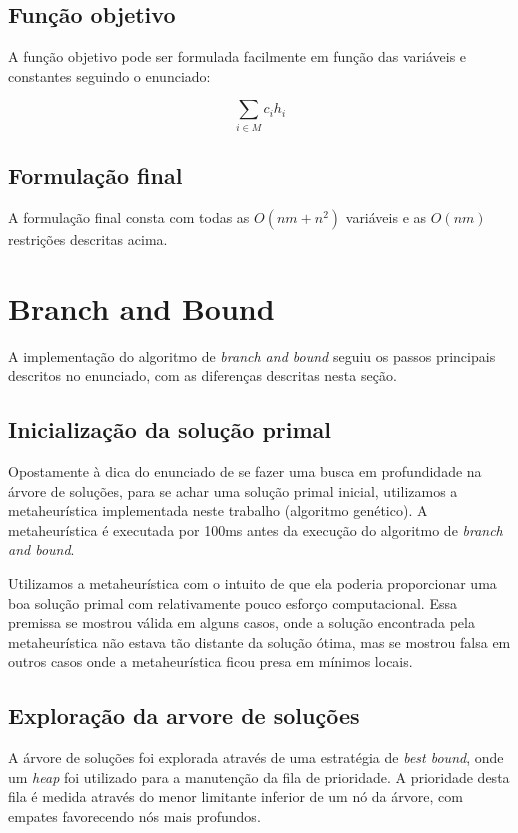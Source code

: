 \documentclass[a4paper,11pt]{article}
\begin{document}
\subsection{Função objetivo}
A função objetivo pode ser formulada facilmente em função das variáveis e constantes
seguindo o enunciado:

\begin{equation}
  \sum_{i \in M} c_i h_i
\end{equation}

\subsection{Formulação final}
A formulação final consta com todas as $O(nm + n^2)$ variáveis e as $O(nm)$
restrições descritas acima.

\section{Branch and Bound}
A implementação do algoritmo de \textit{branch and bound} seguiu os passos principais
descritos no enunciado, com as diferenças descritas nesta seção.

\subsection{Inicialização da solução primal}
Opostamente à dica do enunciado de se fazer uma busca em profundidade na árvore
de soluções, para se achar uma solução primal inicial, utilizamos a metaheurística
implementada neste trabalho (algoritmo genético). A metaheurística é executada
por 100ms antes da execução do algoritmo de \textit{branch and bound}.

Utilizamos a metaheurística com o intuito de que ela poderia proporcionar uma
boa solução primal com relativamente pouco esforço computacional. Essa premissa
se mostrou válida em alguns casos, onde a solução encontrada pela metaheurística
não estava tão distante da solução ótima, mas se mostrou falsa em outros casos
onde a metaheurística ficou presa em mínimos locais.

\subsection{Exploração da arvore de soluções}
A árvore de soluções foi explorada através de uma estratégia de \textit{best bound},
onde um \textit{heap} foi utilizado para a manutenção da fila de prioridade. A prioridade
desta fila é medida através do menor limitante inferior de um nó da árvore, com empates favorecendo
nós mais profundos.
\end{document}
